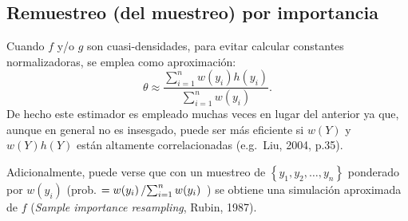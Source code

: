 \documentclass[
]{book}
\theoremstyle{break}
\theoremstyle{nonumberplain}
\begin{document}
\hypertarget{remuestreo-del-muestreo-por-importancia}{%
\subsection{Remuestreo (del muestreo) por importancia}\label{remuestreo-del-muestreo-por-importancia}}

Cuando \(f\) y/o \(g\) son cuasi-densidades, para evitar calcular constantes normalizadoras, se emplea como aproximación:
\[\theta \approx \frac{\sum\limits_{i=1}^n w(y_i) h\left( y_i\right) }{ \sum\limits_{i=1}^n w(y_i)}.\]
De hecho este estimador es empleado muchas veces en lugar del anterior ya que, aunque en general no es insesgado, puede ser más eficiente si \(w(Y)\) y \(w(Y)h(Y)\) están altamente correlacionadas (e.g.~Liu, 2004, p.35).

Adicionalmente, puede verse que con un muestreo de \(\left\{y_1, y_2, \ldots, y_n \right\}\) ponderado por \(w(y_i)\) (prob. \(=w(y_i)\left/ \sum\nolimits_{i=1}^n w(y_i) \right.\) ) se obtiene una simulación aproximada de \(f\) (\emph{Sample importance resampling}, Rubin, 1987).
\end{document}
